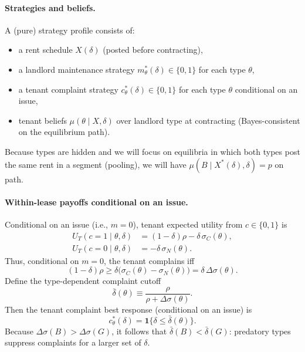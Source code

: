 \documentclass[11pt]{article}
\begin{document}
\paragraph{Strategies and beliefs.}
A (pure) strategy profile consists of:
\begin{itemize}
  \item a rent schedule $X(\delta)$ (posted before contracting),
  \item a landlord maintenance strategy $m^*_\theta(\delta)\in\{0,1\}$ for each type $\theta$,
  \item a tenant complaint strategy $c^*_\theta(\delta)\in\{0,1\}$ for each type $\theta$ conditional on an issue,
  \item tenant beliefs $\mu(\theta\mid X,\delta)$ over landlord type at contracting (Bayes-consistent on the equilibrium path).
\end{itemize}
Because types are hidden and we will focus on equilibria in which both types post the same rent in a segment (pooling), we will have $\mu(B\mid X^*(\delta),\delta)=p$ on path.

\paragraph{Within-lease payoffs conditional on an issue.}
Conditional on an issue (i.e., $m=0$), tenant expected utility from $c\in\{0,1\}$ is
\begin{align}
U_T(c=1\mid \theta,\delta) &= (1-\delta)\rho - \delta\,\sigma_C(\theta), \label{eq:UT_issue_c1}\\
U_T(c=0\mid \theta,\delta) &= -\delta\,\sigma_N(\theta). \label{eq:UT_issue_c0}
\end{align}
Thus, conditional on $m=0$, the tenant complains iff
\[
(1-\delta)\rho \ge \delta\big(\sigma_C(\theta)-\sigma_N(\theta)\big) = \delta\,\Delta\sigma(\theta).
\]
Define the type-dependent complaint cutoff
\begin{equation}
\bar\delta(\theta)\equiv \frac{\rho}{\rho+\Delta\sigma(\theta)}.
\label{eq:deltabar_theta}
\end{equation}
Then the tenant complaint best response (conditional on an issue) is
\begin{equation}
c^*_\theta(\delta)=\mathbf{1}\{\delta\le \bar\delta(\theta)\}.
\label{eq:cstar_theta}
\end{equation}
Because $\Delta\sigma(B)>\Delta\sigma(G)$, it follows that $\bar\delta(B)<\bar\delta(G)$: predatory types suppress complaints for a larger set of $\delta$.
\end{document}
